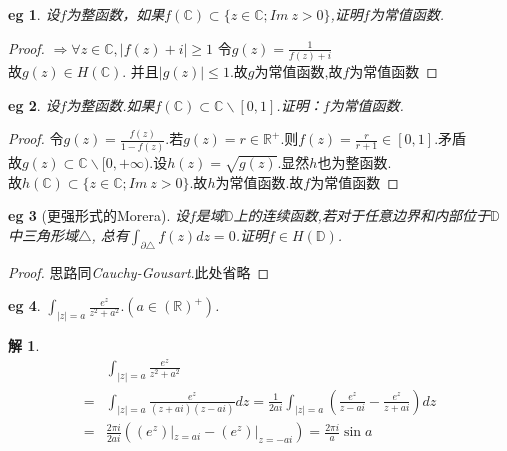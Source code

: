 \documentclass[b5paper,decoration]{qyxf-book}%
\newtheorem*{eg}{eg}%
\newtheorem*{jie}{解}%
\begin{document}
\begin{eg}
    设$f$为整函数，如果$f(\mathbb{C})\subset\{z\in\mathbb{C};I\!m\ z>0\}$,证明$f$为常值函数.
\end{eg}
\begin{proof}
    $\Rightarrow \forall z\in \mathbb{C}, |f(z)+i|\geq 1$ \quad 令$\displaystyle{g(z)=\frac{1}{f(z)+i}}$\\
    故$g(z)\in H(\mathbb{C})$. 并且\quad$|g(z)|\leq1$.故$g$为常值函数,故$f$为常值函数
\end{proof}

\begin{eg}
    设$f$为整函数.如果$f(\mathbb{C})\subset\mathbb{C}\backslash[0,1]$.证明：$f$为常值函数.
\end{eg}
\begin{proof}
    令$\displaystyle{g(z)=\frac{f(z)}{1-f(z)}}$.若$g(z)=r\in\mathbb{R}^+$.则$\displaystyle{f(z)=\frac{r}{r+1}\in[0,1]}$.矛盾\\
    故$g(z)\subset\mathbb{C}\backslash[0,+\infty)$.设$h(z)=\sqrt{g(z)}$.显然$h$也为整函数.\\
    故$h(\mathbb{C})\subset\{z\in\mathbb{C};I\!m\ z>0\}$.故$h$为常值函数.故$f$为常值函数
\end{proof}

\begin{eg}[更强形式的Morera]
    设$f$是域$\mathbb{D}$上的连续函数,若对于任意边界和内部位于$\mathbb{D}$中三角形域$\triangle$,
    总有$\int_{\partial\triangle}f(z)dz=0$.证明$f\in H(\mathbb{D})$.
\end{eg}
\begin{proof}
    思路同\emph{Cauchy-Gousart}.此处省略
\end{proof}

\begin{eg}
    $\displaystyle{\int_{|z|=a}\frac{e^z}{z^2+a^2}.(a\in\mathbb{(R)^+})}$.
\end{eg}
\begin{jie}
    \begin{align*}
        &\int_{|z|=a}\frac{e^z}{z^2+a^2}\\
        =&\int_{|z|=a}\frac{e^z}{(z+ai)(z-ai)}dz=\frac{1}{2ai}\int_{|z|=a}\left(\frac{e^z}{z-ai}-\frac{e^z}{z+ai}\right)dz\\
        =&\frac{2\pi i}{2ai}\left((e^z)|_{z=ai}-(e^z)|_{z=-ai}\right)=\frac{2\pi i}{a}\sin a
    \end{align*}
\end{jie}
\end{document}
